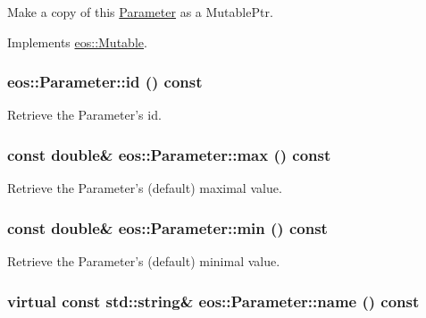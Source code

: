 Make a copy of this \hyperlink{classeos_1_1Parameter}{Parameter} as a MutablePtr. 

Implements \hyperlink{classeos_1_1Mutable_a31d51dbb25d02ad989592b43de8a787b}{eos::Mutable}.\hypertarget{classeos_1_1Parameter_a1cea65462fdafeb7329f6d87fd6e42b4}{
\subsubsection[{id}]{ eos::Parameter::id () const}}
\label{classeos_1_1Parameter_a1cea65462fdafeb7329f6d87fd6e42b4}


Retrieve the Parameter's id. \hypertarget{classeos_1_1Parameter_ac91f5116794dea955ad7ac20e552b730}{
\subsubsection[{max}]{\setlength{\rightskip}{0pt plus 5cm}const double\& eos::Parameter::max () const}}
\label{classeos_1_1Parameter_ac91f5116794dea955ad7ac20e552b730}


Retrieve the Parameter's (default) maximal value. \hypertarget{classeos_1_1Parameter_a37672fa03693d97cdafb23e35fe0e83b}{
\subsubsection[{min}]{\setlength{\rightskip}{0pt plus 5cm}const double\& eos::Parameter::min () const}}
\label{classeos_1_1Parameter_a37672fa03693d97cdafb23e35fe0e83b}


Retrieve the Parameter's (default) minimal value. \hypertarget{classeos_1_1Parameter_a86f581847722de0445ae65065940fd13}{
\subsubsection[{name}]{\setlength{\rightskip}{0pt plus 5cm}virtual const std::string\& eos::Parameter::name () const}}
\label{classeos_1_1Parameter_a86f581847722de0445ae65065940fd13}


